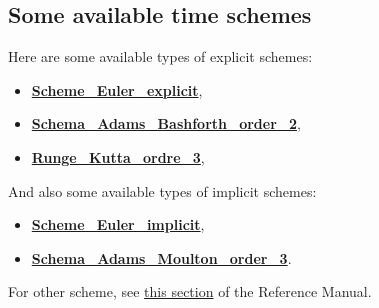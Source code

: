 \subsection{Some available time schemes}
Here are some available types of explicit schemes:
\begin{itemize}
\item \href{TRUST_Reference_Manual.pdf\#eulerscheme}{\textbf{Scheme\_Euler\_explicit}},
\item \href{TRUST_Reference_Manual.pdf\#schemaadamsbashforthorder2}{\textbf{Schema\_Adams\_Bashforth\_order\_2}},
\item \href{TRUST_Reference_Manual.pdf\#rungekuttaordre3}{\textbf{Runge\_Kutta\_ordre\_3}},
\end{itemize}

And also some available types of implicit schemes:
\begin{itemize}
\item \href{TRUST_Reference_Manual.pdf\#schemaeulerimplicite}{\textbf{Scheme\_Euler\_implicit}},
\item \href{TRUST_Reference_Manual.pdf\#schemaadamsmoultonorder3}{\textbf{Schema\_Adams\_Moulton\_order\_3}}.
\end{itemize}

For other scheme, see \href{TRUST_Reference_Manual.pdf\#schematempsbase}{this section} of the Reference Manual.\\


